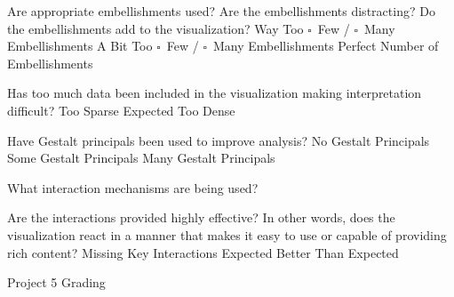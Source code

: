 \documentclass[a4paper,12pt]{article}
\begin{document}
	{Are appropriate embellishments used? Are the embellishments 
    	distracting? Do the embellishments add to the visualization?}
	{Way Too $\square$~Few / $\square$~Many Embellishments}
	{A Bit Too $\square$~Few / $\square$~Many Embellishments}
	{\choice Perfect Number of Embellishments} 
        
	{Has too much data been included in the visualization making 
    	interpretation difficult? } 
	{\choice Too Sparse}
	{\choice Expected}
	{\choice Too Dense} 
        
	{Have Gestalt principals been used to improve analysis?}
	{\choice No Gestalt Principals}
	{\choice Some Gestalt Principals}
	{\choice Many Gestalt Principals} 
        
\EndTable  
 
        
\vspace{15pt}   
 

   	{What interaction mechanisms are being used?}
    {
    }
        
	{Are the interactions provided highly effective? In other words, does 
    	the visualization react in a manner that makes it easy to use or 
        capable of providing rich content?}
    {\choice Missing Key Interactions}
    {\choice Expected}
    {\choice Better Than Expected}
    
\EndTable



\newpage


\begin{center}
{\huge Project 5 Grading}
\end{center}
\end{document}
